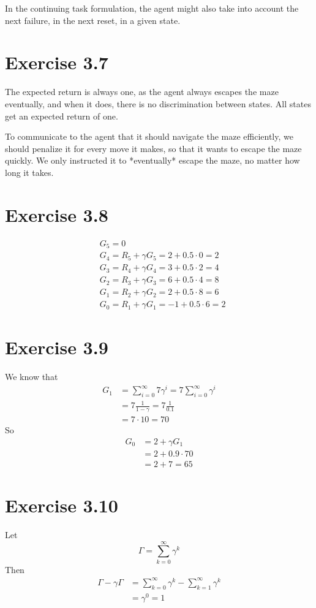 \documentclass[a4paper,11pt,reqno]{amsart}
\begin{document}
In the continuing task formulation, the agent might also take into account the next failure, in the next reset, in a given state. 

\section*{Exercise 3.7}
The expected return is always one, as the agent always escapes the maze eventually, and when it does, there is no discrimination between states. All states get an expected return of one. 

To communicate to the agent that it should navigate the maze efficiently, we should penalize it for every move it makes, so that it wants to escape the maze quickly. We only instructed it to *eventually* escape the maze, no matter how long it takes. 

\section*{Exercise 3.8}
\begin{align}
    &G_5=0\\
    &G_4=R_5 + \gamma G_5 = 2 + 0.5 \cdot 0 = 2\\
    &G_3=R_4 + \gamma G_4 = 3 + 0.5 \cdot 2 = 4\\
    &G_2=R_3+\gamma G_3= 6 + 0.5 \cdot 4 = 8\\
    &G_1=R_2+\gamma G_2=2 + 0.5 \cdot 8 = 6\\
    &G_0=R_1 + \gamma G_1=-1 + 0.5 \cdot 6 = 2
\end{align}

\section*{Exercise 3.9}
We know that 
\begin{align}
    G_1 &=\sum_{i=0}^{\infty} 7\gamma ^{i}=7 \sum_{i =0}^{\infty} \gamma ^{i}\\
        &= 7 \frac{1}{1 - \gamma} = 7 \frac{1}{0.1}\\
        &= 7 \cdot 10 = 70
\end{align}
So 
\begin{align}
    G_0 &=2 + \gamma G_1\\
    &= 2 + 0.9 \cdot 70\\
    &= 2 + 7 = 65
\end{align}

\section*{Exercise 3.10}
Let
\[
    \Gamma = \sum_{k=0}^{\infty} \gamma ^{k}
\]
Then
\begin{align}
    \Gamma - \gamma \Gamma &= \sum_{k =0}^{\infty} \gamma ^{k} - \sum_{k=1}^{\infty} \gamma ^{k}\\
            &= \gamma ^{0}=1
\end{align}
\end{document}
